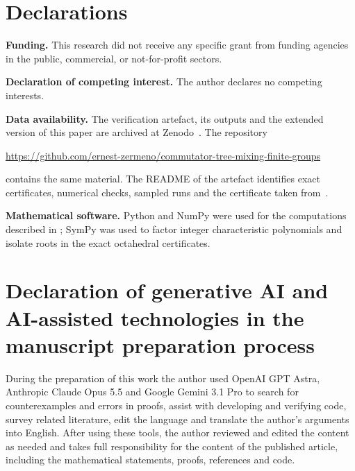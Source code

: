 \documentclass[11pt]{amsart}
\theoremstyle{definition}
\theoremstyle{remark}
\theoremstyle{plain}
\theoremstyle{plain}
\numberwithin{equation}{section}
\newcommand{\parhead}[1]{\par\smallskip\noindent\textbf{#1}\enspace}
\begin{document}
\newpage


\newpage


\newpage


\newpage
\section*{Declarations}
\parhead{Funding.}
This research did not receive any specific grant from funding agencies in the public,
commercial, or not-for-profit sectors.

\parhead{Declaration of competing interest.}
The author declares no competing interests.

\parhead{Data availability.}
The verification artefact, its outputs and the extended version of this
paper are archived at Zenodo~\cite{ZermenoExtended}. The repository
\begin{center}\small
\url{https://github.com/ernest-zermeno/commutator-tree-mixing-finite-groups}
\end{center}
contains the same material. The README of the artefact identifies exact
certificates, numerical checks, sampled runs and the certificate taken
from~\cite{ZermenoS5}.

\parhead{Mathematical software.}
Python and NumPy were used for the computations described in
; SymPy was used to factor integer characteristic
polynomials and isolate roots in the exact octahedral certificates.

\section*{Declaration of generative AI and AI-assisted technologies in the manuscript preparation process}
During the preparation of this work the author used OpenAI GPT Astra,
Anthropic Claude Opus 5.5 and Google Gemini 3.1 Pro to search for
counterexamples and errors in proofs, assist with developing and
verifying code, survey related literature, edit the language and
translate the author's arguments into English. After using these tools,
the author reviewed and edited the content as needed and takes full
responsibility for the content of the published article, including the
mathematical statements, proofs, references and code.



\end{document}
